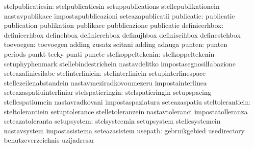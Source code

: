                stelpublicatiesin: stelpublicatiesin                setuppublications
                                  stellepublikationein             nastavpublikace
                                  impostapubblicazioni             seteazapublicatii
                      publicatie: publicatie                       publication
                                  publikation                      publikace
                                  pubblicazione                    publicatie
                   definieerhbox: definieerhbox                    definehbox
                                  definierehbox                    definujhbox
                                  definiscihbox                    definestehbox
                       toevoegen: toevoegen                        adding
                                  zusatz                           scitani
                                  adding                           adauga %
                          punten: punten                           periods
                                  punkt                            tecky
                                  punti                            puncte
               stelkoppeltekenin: stelkoppeltekenin                setuphyphenmark
                                  stellebindestrichein             nastavdelitko
                                  impostasegnosillabazione         seteazaliniesilabe %
                stelinterliniein: stelinterliniein                 setupinterlinespace
                                  stellezeilenabstandein           nastavmeziradkovoumezeru
                                  impostainterlinea                seteazaspatiuinterliniar
                stelspatieringin: stelspatieringin                 setupspacing
                                  stellespatiumein                 nastavradkovani
                                  impostaspaziatura                seteazaspatiu
                steltolerantiein: steltolerantiein                 setuptolerance
                                  stelletoleranzein                nastavtoleranci
                                  impostatolleranza                seteazatoleranta
                     setupsystem: stelsysteemin                    setupsystem
                                  stellesystemein                  nastavsystem
                                  impostasistema                   seteazasistem
                         usepath: gebruikgebied                    usedirectory
                                  benutzeverzeichnis               uzijadresar %

